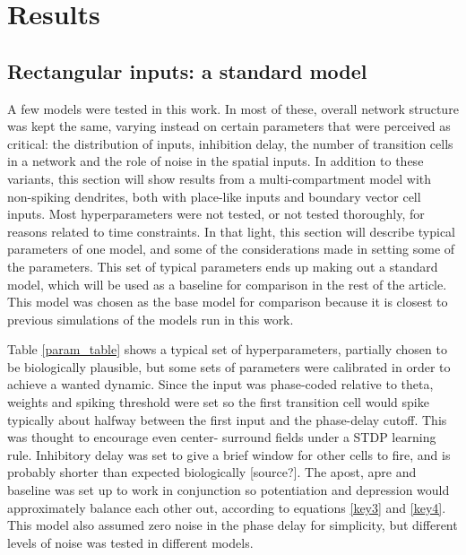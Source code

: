 \documentclass{article}
\begin{document}
    \section{Results}

    \subsection{Rectangular inputs: a standard model}
    A few models were tested in this work. In most of these, overall network structure was kept the same, varying instead on certain parameters that were perceived as critical: the distribution of inputs, inhibition delay, the number of transition cells in a network and the role of noise in the spatial inputs. In addition to these variants, this section will show results from a multi-compartment model with non-spiking dendrites, both with place-like inputs and boundary vector cell inputs. Most hyperparameters were not tested, or not tested thoroughly, for reasons related to time constraints. In that light, this section will describe typical parameters of one model, and some of the considerations made in setting some of the parameters. This set of typical parameters ends up making out a standard model, which will be used as a baseline for comparison in the rest of the article. This model was chosen as the base model for comparison because it is closest to previous simulations of the models run in this work.

    Table \ref{param_table} shows a typical set of hyperparameters, partially chosen to be biologically plausible, but some sets of parameters were calibrated in order to achieve a wanted dynamic. Since the input was phase-coded relative to theta, weights and spiking threshold were set so the first transition cell would spike typically about halfway between the first input and the phase-delay cutoff. This was thought to encourage even center- surround fields under a STDP learning rule. Inhibitory delay was set to give a brief window for other cells to fire, and is probably shorter than expected biologically [source?]. The apost, apre and baseline was set up to work in conjunction so potentiation and depression would approximately balance each other out, according to equations \ref{key3} and \ref{key4}. This model also assumed zero noise in the phase delay for simplicity, but different levels of noise was tested in different models.
\end{document}
